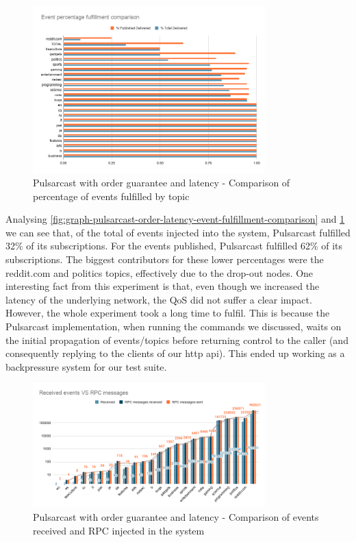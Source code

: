 \begin{figure}[!htb]
  \centering
  \includegraphics[width=0.8\textwidth]{img/graph-pulsarcast-order-latency-event-percentage-fulfillment-comparison.png}
  \caption{Pulsarcast with order guarantee and latency - Comparison of percentage of events fulfilled by topic}
  \label{fig:graph-pulsarcast-order-latency-event-percentage-fulfillment-comparison}
\end{figure}

Analysing \ref{fig:graph-pulsarcast-order-latency-event-fulfillment-comparison}
and
\ref{fig:graph-pulsarcast-order-latency-event-percentage-fulfillment-comparison}
we can see that, of the total of events injected into the system, Pulsarcast
fulfilled 32\% of its subscriptions. For the events published, Pulsarcast
fulfilled 62\% of its subscriptions. The biggest contributors for these lower
percentages were the reddit.com and politics topics, effectively due to the
drop-out nodes. One interesting fact from this experiment is that, even though
we increased the latency of the underlying network, the QoS did not suffer a
clear impact.  However, the whole experiment took a long time to fulfil. This
is because the Pulsarcast implementation, when running the commands we
discussed, waits on the initial propagation of events/topics before returning
control to the caller (and consequently replying to the clients of our
\acrshort{http} \acrshort{api}). This ended up working as a backpressure system for our
test suite.

\begin{figure}[!htb]
  \centering
  \includegraphics[width=0.8\textwidth]{img/graph-pulsarcast-order-latency-rpc.png}
  \caption{Pulsarcast with order guarantee and latency - Comparison of events received and RPC injected in the system}
  \label{fig:graph-pulsarcast-order-latency-rpc}
\end{figure}


